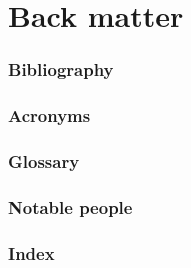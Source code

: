 \renewcommand{\thispart}{11 }
\renewcommand{\thispartname}{Back matter}

\part{\thispartname}

\renewcommand{\thesection}{\Roman{section}.}

\section{Bibliography}


\section{Acronyms}


\section{Glossary}


\section{Notable people}


\section{Index}


